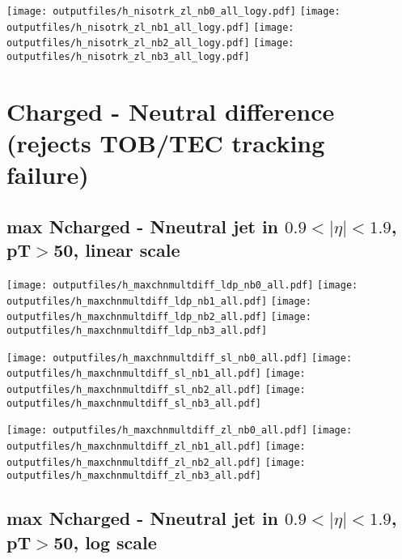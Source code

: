 \documentclass[11pt]{article}
\begin{document}
    \noindent
     \texttt{[image: outputfiles/h\_nisotrk\_zl\_nb0\_all\_logy.pdf]}
     \texttt{[image: outputfiles/h\_nisotrk\_zl\_nb1\_all\_logy.pdf]}
     \texttt{[image: outputfiles/h\_nisotrk\_zl\_nb2\_all\_logy.pdf]}
     \texttt{[image: outputfiles/h\_nisotrk\_zl\_nb3\_all\_logy.pdf]}


    \clearpage


 \section{ Charged - Neutral difference (rejects TOB/TEC tracking failure)}

    \subsection{ max Ncharged - Nneutral jet in  $0.9 < |\eta|< 1.9$, pT$>$50, linear scale}

    \noindent
     \texttt{[image: outputfiles/h\_maxchnmultdiff\_ldp\_nb0\_all.pdf]}
     \texttt{[image: outputfiles/h\_maxchnmultdiff\_ldp\_nb1\_all.pdf]}
     \texttt{[image: outputfiles/h\_maxchnmultdiff\_ldp\_nb2\_all.pdf]}
     \texttt{[image: outputfiles/h\_maxchnmultdiff\_ldp\_nb3\_all.pdf]}

    \noindent
     \texttt{[image: outputfiles/h\_maxchnmultdiff\_sl\_nb0\_all.pdf]}
     \texttt{[image: outputfiles/h\_maxchnmultdiff\_sl\_nb1\_all.pdf]}
     \texttt{[image: outputfiles/h\_maxchnmultdiff\_sl\_nb2\_all.pdf]}
     \texttt{[image: outputfiles/h\_maxchnmultdiff\_sl\_nb3\_all.pdf]}

    \noindent
     \texttt{[image: outputfiles/h\_maxchnmultdiff\_zl\_nb0\_all.pdf]}
     \texttt{[image: outputfiles/h\_maxchnmultdiff\_zl\_nb1\_all.pdf]}
     \texttt{[image: outputfiles/h\_maxchnmultdiff\_zl\_nb2\_all.pdf]}
     \texttt{[image: outputfiles/h\_maxchnmultdiff\_zl\_nb3\_all.pdf]}

    \clearpage


    \subsection{ max Ncharged - Nneutral jet in $0.9 < |\eta|< 1.9$, pT$>$50, log scale}
\end{document}
